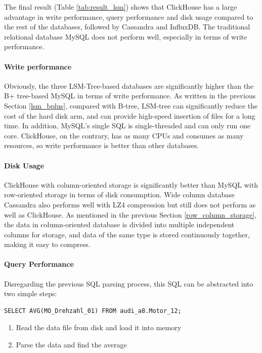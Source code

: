 The final result (Table \ref{tab:result_lsm}) shows that ClickHouse has a large advantage in write performance, query performance and disk usage compared to the rest of the databases, followed by Cassandra and InfluxDB. The traditional relational database MySQL does not perform well, especially in terms of write performance. 

\paragraph{Write performance}
Obviously, the three LSM-Tree-based databases are significantly higher than the B+ tree-based MySQL in terms of write performance. As written in the previous Section \ref{lsm_bplus}, compared with B-tree, LSM-tree can significantly reduce the cost of the hard disk arm, and can provide high-speed insertion of files for a long time. In addition, MySQL's single SQL is single-threaded and can only run one core. ClickHouse, on the contrary, has as many CPUs and consumes as many resources, so write performance is better than other databases.

\paragraph{Disk Usage}
ClickHouse with column-oriented storage is significantly better than MySQL with row-oriented storage in terms of disk consumption. Wide column database Cassandra also performs well with LZ4 compression but still does not perform as well as ClickHouse. As mentioned in the previous Section \ref{row_column_storage}, the data in column-oriented database is divided into multiple independent columns for storage, and data of the same type is stored continuously together, making it easy to compress.

\paragraph{Query Performance}

Disregarding the previous SQL parsing process, this SQL can be abstracted into two simple steps:

\begin{verbatim}
SELECT AVG(MO_Drehzahl_01) FROM audi_a8.Motor_12;
\end{verbatim}


\begin{enumerate}
    \item Read the data file from disk and load it into memory
    \item Parse the data and find the average
\end{enumerate}

